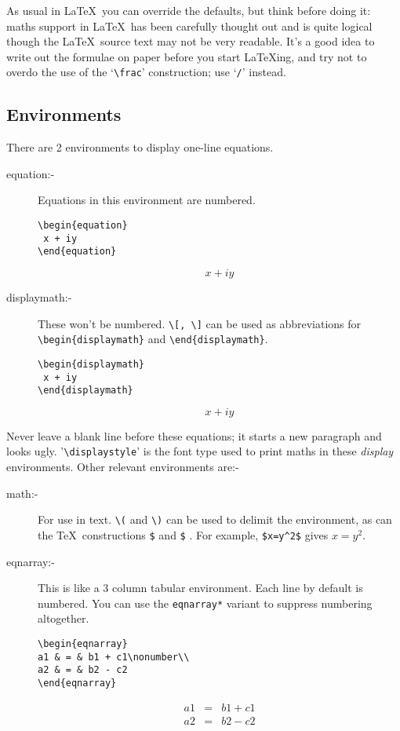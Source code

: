 \documentclass[dvips]{article}
\begin{document}
As usual in \LaTeX\ you can override the defaults, but think before doing
 it: maths support in \LaTeX\ has been carefully thought out and is 
quite logical though the \LaTeX\ source text may not be very readable.
It's a good idea to write out the formulae on paper before you start
\LaTeX ing, and try not to overdo the use of the `\verb|\frac|' 
construction; use `\verb|/|' instead. 



\subsection{Environments}
There are 2 environments to display one-line equations.


\begin{description}

\item[equation:-] Equations in this environment are numbered.
\begin{verbatim}
\begin{equation}
 x + iy
\end{equation}
\end{verbatim}
\begin{equation}
 x + iy
\end{equation}
\item[displaymath:-] These won't be numbered.  \verb|\[, \]| 
can be used as abbreviations for \verb|\begin{displaymath}| and
\verb|\end{displaymath}|.
\begin{verbatim}
\begin{displaymath}
 x + iy
\end{displaymath}
\end{verbatim}
\begin{displaymath}
 x + iy
\end{displaymath}

\end{description}
Never leave a blank line before these equations; it 
starts a new paragraph and looks ugly. 
'\verb|\displaystyle|' is the font type used to print maths in these 
\emph{display} environments. Other relevant environments are:-
\begin{description}
\item[math:-] For use in text. \verb|\(| and  \verb|\)| can be used
to delimit the environment, as can the \TeX\ constructions \verb|$| 
and \verb|$| . For example, \verb|$x=y^2$| gives $x=y^2$.
\item[eqnarray:-]
This is like a 3 column tabular environment. Each line by default is numbered.
You can use  the  \verb|eqnarray*| variant to suppress numbering altogether.
\begin{verbatim}
\begin{eqnarray}
a1 & = & b1 + c1\nonumber\\
a2 & = & b2 - c2
\end{eqnarray}
\end{verbatim}
\begin{eqnarray}
a1 & = & b1 + c1\nonumber\\
a2 & = & b2 - c2
\end{eqnarray}
\end{description}
\end{document}
